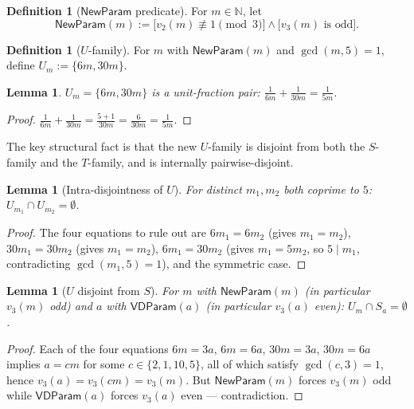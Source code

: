 \documentclass[11pt]{amsart}
\theoremstyle{plain}
\newtheorem{lemma}[theorem]{Lemma}
\theoremstyle{definition}
\newtheorem{definition}[theorem]{Definition}
\newcommand{\N}{\mathbb{N}}
\newcommand{\vdp}{\mathsf{VDParam}}
\newcommand{\np}{\mathsf{NewParam}}
\begin{document}
\begin{definition}[$\np$ predicate]
For $m \in \N$, let
\[
  \np(m) := \bigl[v_2(m) \not\equiv 1 \pmod{3}\bigr] \wedge \bigl[v_3(m) \text{ is odd}\bigr].
\]
\end{definition}

\begin{definition}[$U$-family]
For $m$ with $\np(m)$ and $\gcd(m, 5) = 1$, define $U_m := \{6m, 30m\}$.
\end{definition}

\begin{lemma}\label{lem:u-pair}
$U_m = \{6m, 30m\}$ is a unit-fraction pair: $\frac{1}{6m} + \frac{1}{30m} = \frac{1}{5m}$.
\end{lemma}

\begin{proof}
$\frac{1}{6m} + \frac{1}{30m} = \frac{5 + 1}{30m} = \frac{6}{30m} = \frac{1}{5m}$.
\end{proof}

The key structural fact is that the new $U$-family is disjoint from both the $S$-family and the $T$-family, and is internally pairwise-disjoint.

\begin{lemma}[Intra-disjointness of $U$]\label{lem:u-intra}
For distinct $m_1, m_2$ both coprime to $5$: $U_{m_1} \cap U_{m_2} = \emptyset$.
\end{lemma}

\begin{proof}
The four equations to rule out are $6 m_1 = 6 m_2$ (gives $m_1 = m_2$), $30 m_1 = 30 m_2$ (gives $m_1 = m_2$), $6 m_1 = 30 m_2$ (gives $m_1 = 5 m_2$, so $5 \mid m_1$, contradicting $\gcd(m_1, 5) = 1$), and the symmetric case.
\end{proof}

\begin{lemma}[$U$ disjoint from $S$]\label{lem:u-disjoint-s}
For $m$ with $\np(m)$ (in particular $v_3(m)$ odd) and $a$ with $\vdp(a)$ (in particular $v_3(a)$ even): $U_m \cap S_a = \emptyset$.
\end{lemma}

\begin{proof}
Each of the four equations $6m = 3a$, $6m = 6a$, $30m = 3a$, $30m = 6a$ implies $a = c m$ for some $c \in \{2, 1, 10, 5\}$, all of which satisfy $\gcd(c, 3) = 1$, hence $v_3(a) = v_3(cm) = v_3(m)$. But $\np(m)$ forces $v_3(m)$ odd while $\vdp(a)$ forces $v_3(a)$ even --- contradiction.
\end{proof}
\end{document}

